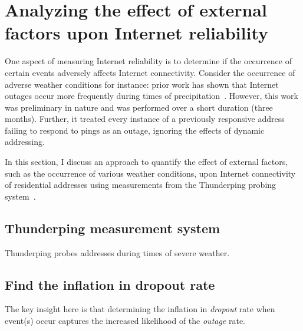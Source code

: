 
\section{Analyzing the effect of external factors upon Internet reliability}
\label{sec:weather}

One aspect of measuring Internet reliability is to determine if the occurrence of certain events adversely affects Internet connectivity. Consider the occurrence of adverse weather conditions for instance: prior work has shown that Internet outages occur more frequently during times of precipitation~\cite{pingin}. However, this work was preliminary in nature and was performed over a short duration (three months). Further, it treated every instance of a previously responsive address failing to respond to pings as an outage, ignoring the effects of dynamic addressing.

In this section, I discuss an approach to quantify the effect of external factors, such as the occurrence of various weather conditions, upon Internet connectivity of residential addresses using measurements from the Thunderping probing system~\cite{pingin}. 

\subsection{Thunderping measurement system}

Thunderping probes addresses during times of severe weather. 

\subsection{Find the inflation in dropout rate}

The key insight here is that determining the inflation in \emph{dropout} rate when event(s) occur captures the increased likelihood of the \emph{outage} rate. 




 